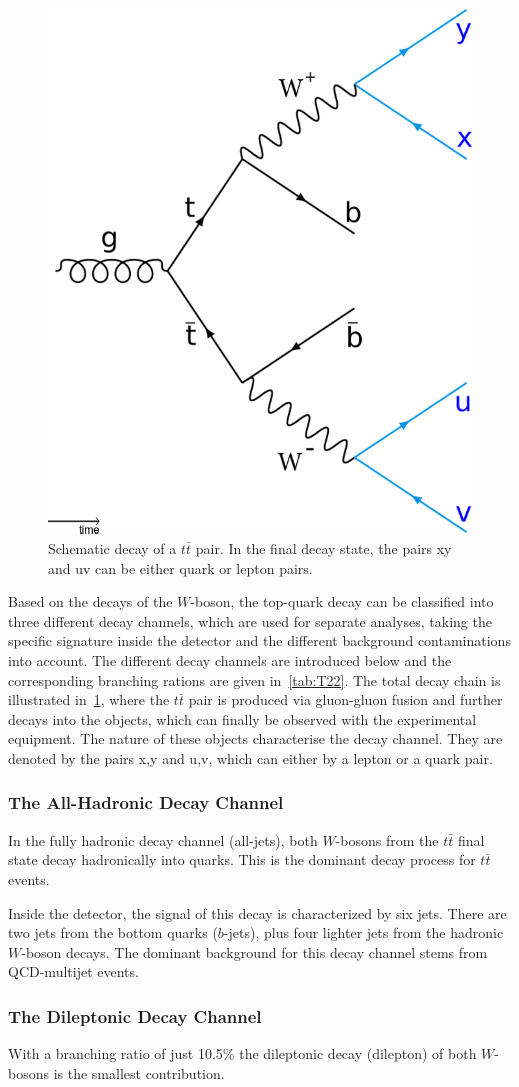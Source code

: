 \begin{figure}[h]
	\centering
	\includegraphics[width=0.3\linewidth]{Pics/cp1/Decay}
	\caption{Schematic decay of a $t\bar{t}$ pair. In the final decay state, the pairs xy and uv can be either quark or lepton pairs.  }
	\label{fig:Decay}
\end{figure}

 Based on the decays of the $W$-boson, the top-quark decay can be classified into three different decay channels, which are used for separate analyses, taking the specific signature inside the detector and the different background contaminations into account. The different decay channels are introduced below and  the corresponding branching rations are given in~\cref{tab:T22}. The total decay chain is illustrated in~\cref{fig:Decay}, where the  $t\bar{t}$ pair is produced via  gluon-gluon fusion and further decays into the objects, which can finally be observed with the experimental equipment. The nature of these objects characterise the decay channel. They are denoted by the pairs x,y and u,v, which can either by a lepton or a quark pair.




\subsubsection{The All-Hadronic Decay Channel}
In the fully hadronic decay channel (all-jets), both $W$-bosons from the $t\bar{t}$ final state decay hadronically into quarks. This is the dominant decay process for $t\bar{t}$ events. 

 Inside the detector, the signal of this decay is characterized by six jets. There are two jets  from the bottom quarks ($b$-jets), plus four lighter jets from the hadronic $W$-boson decays. The dominant background  for this decay channel stems from QCD-multijet events.

\subsubsection{The Dileptonic Decay Channel}
With a branching ratio of just 10.5\% the dileptonic decay (dilepton) of both $W$-bosons is the smallest contribution. 

